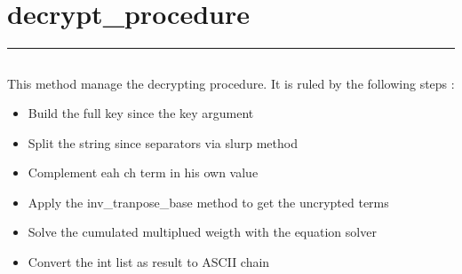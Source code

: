 \documentclass[letterpaper,10pt,english]{sphinxmanual}
\begin{document}
\newpage
\section{decrypt\_procedure}
\label{\detokenize{decrypt_procedurev3.1:decrypt-procedure}}\label{\detokenize{decrypt_procedurev3.1::doc}}
\begin{sphinxVerbatim}[commandchars=\\\{\}]
 
\end{sphinxVerbatim}


\bigskip\hrule\bigskip



\subsection{}
\label{\detokenize{decrypt_procedurev3.1:algorithm}}
\sphinxAtStartPar
This method manage the decrypting procedure.
It is ruled by the following steps :
\begin{itemize}
\item {} 
\sphinxAtStartPar
Build the full key since the key argument

\item {} 
\sphinxAtStartPar
Split the string since separators via slurp method

\item {} 
\sphinxAtStartPar
Complement eah ch term in his own value

\item {} 
\sphinxAtStartPar
Apply the inv\_tranpose\_base method to get the uncrypted terms

\item {} 
\sphinxAtStartPar
Solve the cumulated multiplued weigth with the equation solver

\item {} 
\sphinxAtStartPar
Convert the int list as result to ASCII chain

\end{itemize}
\end{document}
